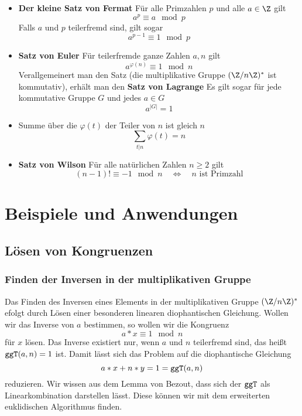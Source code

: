 \begin{itemize}
	\item \textbf{Der kleine Satz von Fermat} Für alle Primzahlen $p$ und alle $a\in\Z$ gilt
	\begin{equation*}
		a^p\equiv a\mod p
	\end{equation*}
	Falls $a$ und $p$ teilerfremd sind, gilt sogar
	\begin{equation*}
		a^{p-1}\equiv 1\mod p
	\end{equation*}

	\item \textbf{Satz von Euler} Für teilerfremde ganze Zahlen $a,n$ gilt
	\begin{equation*}
		a^{\varphi(n)}\equiv 1 \mod n
	\end{equation*}
	Verallgemeinert man den Satz (die multiplikative Gruppe $(\Z/n\Z)^\ast$ ist kommutativ), erhält man den \textbf{Satz von Lagrange} Es gilt sogar für jede kommutative Gruppe $G$ und jedes $a\in G$ 
	\begin{equation*}
	 	a^{|G|}=1
	\end{equation*} 

	\item Summe über die $\varphi(t)$ der Teiler von $n$ ist gleich $n$
	\begin{equation*}
		\sum_{t|n}\varphi(t)=n
	\end{equation*}

	\item \textbf{Satz von Wilson} Für alle natürlichen Zahlen $n\geq 2$ gilt
	\begin{equation*}
		(n-1)!\equiv -1\mod n\quad\Leftrightarrow\quad n \text{ ist Primzahl}
	\end{equation*}
\end{itemize}


\section{Beispiele und Anwendungen}
\subsection{Lösen von Kongruenzen}
\subsubsection{Finden der Inversen in der multiplikativen Gruppe}
\label{subsubsec:inverse}
Das Finden des Inversen eines Elements in der multiplikativen Gruppe $(\Z/n\Z)^\ast$ efolgt durch Lösen einer besonderen linearen diophantischen Gleichung. Wollen wir das Inverse von $a$ bestimmen, so wollen wir die Kongruenz
\begin{equation*}
	a*x\equiv 1 \mod n
\end{equation*}
für $x$ lösen. Das Inverse existiert nur, wenn $a$ und $n$ teilerfremd sind, das heißt $\texttt{ggT}(a,n)=1$ ist. Damit lässt sich das Problem auf die diophantische Gleichung
\begin{equation*}
	a*x+n*y = 1 = \texttt{ggT}(a,n)
\end{equation*}
reduzieren. Wir wissen aus dem Lemma von Bezout, dass sich der $\texttt{ggT}$ als Linearkombination darstellen lässt. Diese können wir mit dem erweiterten euklidischen Algorithmus finden.
